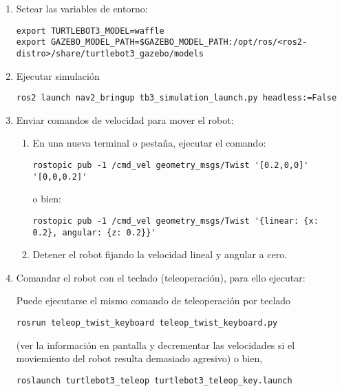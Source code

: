 \documentclass[tp]{lcc}
\begin{document}
\begin{enumerate}

\item Setear las variables de entorno:

\begin{lstlisting}[style=bash] 
export TURTLEBOT3_MODEL=waffle
export GAZEBO_MODEL_PATH=$GAZEBO_MODEL_PATH:/opt/ros/<ros2-distro>/share/turtlebot3_gazebo/models
\end{lstlisting}
	\item Ejecutar simulación

\begin{lstlisting}[style=bash] 
    ros2 launch nav2_bringup tb3_simulation_launch.py headless:=False
\end{lstlisting}


	\item Enviar comandos de velocidad para mover el robot:

	\begin{enumerate}
	\item En una nueva terminal o pestaña, ejecutar el comando:

\begin{lstlisting}[style=bash] 
rostopic pub -1 /cmd_vel geometry_msgs/Twist '[0.2,0,0]' '[0,0,0.2]'
\end{lstlisting}
o bien:
\begin{lstlisting}[style=bash] 
rostopic pub -1 /cmd_vel geometry_msgs/Twist '{linear: {x: 0.2}, angular: {z: 0.2}}'
\end{lstlisting}

\item Detener el robot fijando la velocidad lineal y angular a cero.
	\end{enumerate}

\item Comandar el robot con el teclado (teleoperación), para ello ejecutar:

Puede ejecutarse el mismo comando de teleoperación por teclado
\begin{lstlisting}[style=bash] 
rosrun teleop_twist_keyboard teleop_twist_keyboard.py
\end{lstlisting}
(ver la información en pantalla y decrementar las velocidades si el moviemiento del robot
resulta demasiado agresivo)
o bien,
\begin{lstlisting}[style=bash] 
roslaunch turtlebot3_teleop turtlebot3_teleop_key.launch
\end{lstlisting}

\end{enumerate}
\end{document}
